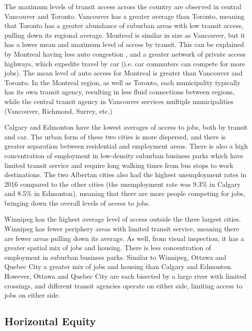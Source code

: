 \documentclass[11 pt, letterpaper]{article}
\begin{document}
{The maximum levels of transit access across the country are observed in central Vancouver and Toronto. Vancouver has a greater average than Toronto, meaning that Toronto has a greater abundance of suburban areas with low transit access, pulling down its regional average. Montreal is similar in size as Vancouver, but it has a lower mean and maximum level of access by transit. This can be explained by Montreal having less auto congestion \cite{tomtom2018}, and a greater network of private access highways, which expedite travel by car (i.e. car commuters can compete for more jobs). The mean level of auto access for Montreal is greater than Vancouver and Toronto. In the Montreal region, as well as Toronto, each municipality typically has its own transit agency, resulting in less fluid connections between regions, while the central transit agency in Vancouver services multiple municipalities (Vancouver, Richmond, Surrey, etc.)

Calgary and Edmonton have the lowest averages of access to jobs, both by transit and car. The urban form of these two cities is more dispersed, and there is greater separation between residential and employment areas. There is also a high concentration of employment in low-density suburban business parks which have limited transit service and require long walking times from bus stops to work destinations. The two Albertan cities also had the highest unemployment rates in 2016 compared to the other cities (the unemployment rate was 9.3\% in Calgary and 8.5\% in Edmonton), meaning that there are more people competing for jobs, bringing down the overall levels of access to jobs.

Winnipeg has the highest average level of access outside the three largest cities. Winnipeg has fewer periphery areas with limited transit service, meaning there are fewer areas pulling down its average. As well, from visual inspection, it has a greater spatial mix of jobs and housing. There is less concentration of employment in suburban business parks. Similar to Winnipeg, Ottawa and Quebec City a greater mix of jobs and housing than Calgary and Edmonton. However, Ottawa and Quebec City are each bisected by a large river with limited crossings, and different transit agencies operate on either side, limiting access to jobs on either side.




\subsection{Horizontal Equity}

}
\end{document}
